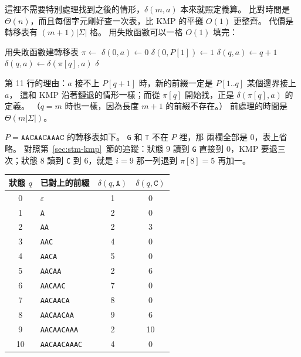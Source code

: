 這裡不需要特別處理找到之後的情形，$\delta(m, a)$ 本來就照定義算。 比對時間是
$\Theta(n)$，而且每個字元剛好查一次表，比 KMP 的平攤 $O(1)$ 更整齊。 代價是轉移表有
$(m + 1)|\Sigma|$ 格。 用失敗函數可以一格 $O(1)$ 填完：

\begin{pseudo}[label=alg:stm-dfa-build]{用失敗函數建轉移表}
    \State $\pi \gets$ 
        \State $\delta(0, a) \gets 0$
    \EndFor
    \State $\delta(0, P[1]) \gets 1$
                \State $\delta(q, a) \gets q + 1$
            \Else
                \State $\delta(q, a) \gets \delta(\pi[q], a)$ 
            \EndIf
        \EndFor
    \EndFor
    \State \Return $\delta$
\EndFunction
\end{pseudo}

第 11 行的理由：$a$ 接不上 $P[q + 1]$ 時，新的前綴一定是 $P[1..q]$ 某個邊界接上 $a$，
這和 KMP 沿著鏈退的情形一樣；而從 $\pi[q]$ 開始找，正是 $\delta(\pi[q], a)$ 的定義。
（$q = m$ 時也一樣，因為長度 $m + 1$ 的前綴不存在。） 前處理的時間是
$\Theta(m |\Sigma|)$。

$P = \mathtt{AACAACAAAC}$ 的轉移表如下。 \texttt{G} 和 \texttt{T} 不在 $P$ 裡，那
兩欄全部是 $0$，表上省略。 對照第~\ref{sec:stm-kmp}~節的追蹤：狀態 $9$ 讀到
\texttt{G} 直接到 $0$，KMP 要退三次；狀態 $8$ 讀到 \texttt{C} 到 $6$，就是 $i = 9$
那一列退到 $\pi[8] = 5$ 再加一。

\begin{center}
\small
\begin{tabular}{clcc}
\toprule
狀態 $q$ & 已對上的前綴 & $\delta(q, \mathtt{A})$ & $\delta(q, \mathtt{C})$ \\
\midrule
0 & $\varepsilon$ & 1 & 0 \\
1 & \texttt{A} & 2 & 0 \\
2 & \texttt{AA} & 2 & 3 \\
3 & \texttt{AAC} & 4 & 0 \\
4 & \texttt{AACA} & 5 & 0 \\
5 & \texttt{AACAA} & 2 & 6 \\
6 & \texttt{AACAAC} & 7 & 0 \\
7 & \texttt{AACAACA} & 8 & 0 \\
8 & \texttt{AACAACAA} & 9 & 6 \\
9 & \texttt{AACAACAAA} & 2 & 10 \\
10 & \texttt{AACAACAAAC} & 4 & 0 \\
\bottomrule
\end{tabular}
\end{center}

